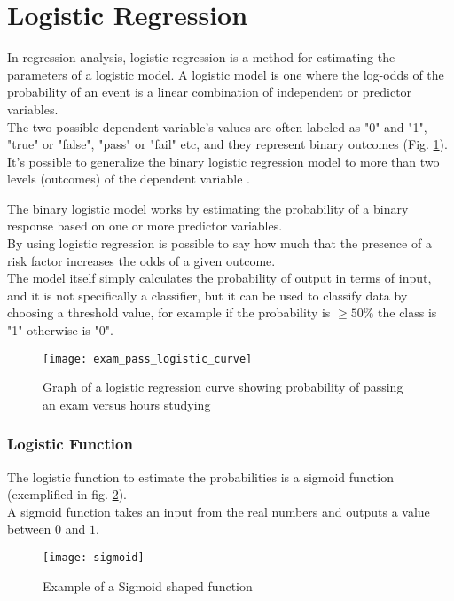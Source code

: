 \clearpage

\section{Logistic Regression} \label{logreg}
In regression analysis, logistic regression is a method for estimating the parameters of a logistic model. A logistic model is one where the log-odds of the probability of an event is a linear combination of independent or predictor variables. \\
The two possible dependent variable's values are often labeled as "0" and "1", "true" or "false", "pass" or "fail" etc, and they represent binary outcomes (Fig. \ref{fig:logistic_exam}). \\
It's possible to generalize the binary logistic regression model to more than two levels (outcomes) of the dependent variable \cite{wiki:logisticreg}.

The binary logistic model works by estimating the probability of a binary response based on one or more predictor variables.\\
By using logistic regression is possible to say how much that the presence of a risk factor increases the odds of a given outcome. \\
The model itself simply calculates the probability of output in terms of input, and it is not specifically a classifier, but it can be used to classify data by choosing a threshold value, for example if the probability is $\ge 50\%$ the class is "1" otherwise is "0".

\begin{figure}[H]
	\centering
	\texttt{[image: exam\_pass\_logistic\_curve]}
	\caption{Graph of a logistic regression curve showing probability of passing an exam versus hours studying \cite{wiki:logisticreg}}
	\label{fig:logistic_exam}
\end{figure}

\subsubsection{Logistic Function}
The logistic function to estimate the probabilities is a sigmoid function (exemplified in fig. \ref{fig:sigmoid}). \\
A sigmoid function takes an input from the real numbers and outputs a value between $0$ and $1$.

\begin{figure}[H]
	\centering
	\texttt{[image: sigmoid]}
	\caption{Example of a Sigmoid shaped function}
	\label{fig:sigmoid}
\end{figure}

